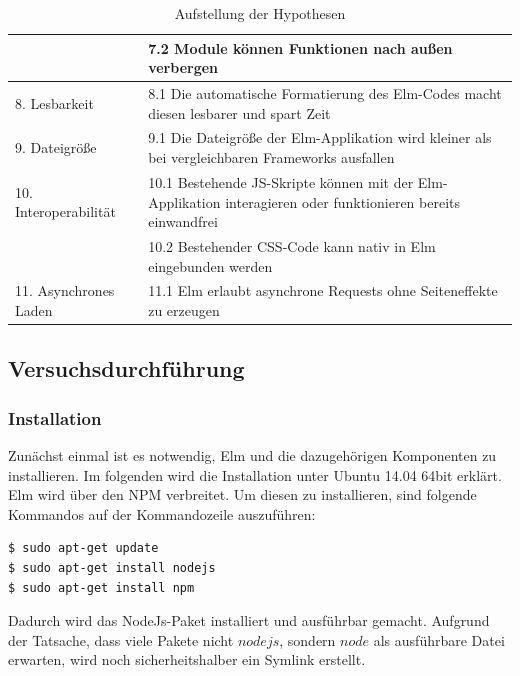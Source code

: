 \begin{table}[p]
\begin{tabular}{ | l | p{7.6cm} | }
	& 7.2 Module können Funktionen nach außen verbergen\\
	\hline
	8. Lesbarkeit &  8.1 Die automatische Formatierung des Elm-Codes macht diesen lesbarer und spart Zeit\\	
	\hline
	9. Dateigröße &  9.1 Die Dateigröße der Elm-Applikation wird kleiner als bei vergleichbaren Frameworks ausfallen\\
	\hline
	10. Interoperabilität &  10.1 Bestehende \ac{JS}-Skripte können mit der Elm-Applikation interagieren oder funktionieren bereits einwandfrei\\
	& 10.2 Bestehender \ac{CSS}-Code kann nativ in Elm eingebunden werden\\
	\hline
	11. Asynchrones Laden &  11.1 Elm erlaubt asynchrone Requests ohne Seiteneffekte zu erzeugen\\
	\hline
\end{tabular}
\caption{Aufstellung der Hypothesen}\label{tab:Hypothesentabelle}
\end{table}

\subsection{Versuchsdurchführung}
\label{sec:Versuchsdurchführung}
\subsubsection{Installation}
\label{sec:Installation}
Zunächst einmal ist es notwendig, Elm und die dazugehörigen Komponenten zu installieren. Im folgenden wird die Installation unter Ubuntu 14.04 64bit erklärt.
Elm wird über den NPM verbreitet. Um diesen zu installieren, sind folgende Kommandos auf der Kommandozeile auszuführen:

\begin{lstlisting}[language=bash]
$ sudo apt-get update
$ sudo apt-get install nodejs
$ sudo apt-get install npm
\end{lstlisting}

Dadurch wird das NodeJs-Paket installiert und ausführbar gemacht. Aufgrund der Tatsache, dass viele Pakete nicht $nodejs$, sondern $node$ als ausführbare Datei erwarten, wird noch sicherheitshalber ein Symlink erstellt.

